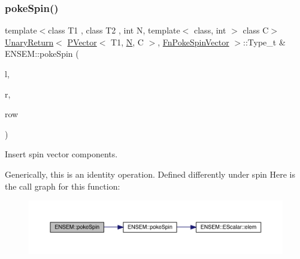 \subsubsection{\texorpdfstring{pokeSpin()}{pokeSpin()}\hspace{0.1cm}{\footnotesize\ttfamily [1/2]}}
{\footnotesize\ttfamily template$<$class T1 , class T2 , int N, template$<$ class, int $>$ class C$>$ \\
\mbox{\hyperlink{structENSEM_1_1UnaryReturn}{Unary\+Return}}$<$ \mbox{\hyperlink{classENSEM_1_1PVector}{P\+Vector}}$<$ T1, \mbox{\hyperlink{operator__name__util_8cc_a7722c8ecbb62d99aee7ce68b1752f337}{N}}, C $>$, \mbox{\hyperlink{structENSEM_1_1FnPokeSpinVector}{Fn\+Poke\+Spin\+Vector}} $>$\+::Type\+\_\+t \& E\+N\+S\+E\+M\+::poke\+Spin (\begin{DoxyParamCaption}\item[{\mbox{\hyperlink{classENSEM_1_1PVector}{P\+Vector}}$<$ T1, \mbox{\hyperlink{operator__name__util_8cc_a7722c8ecbb62d99aee7ce68b1752f337}{N}}, C $>$ \&}]{l,  }\item[{const \mbox{\hyperlink{classENSEM_1_1PVector}{P\+Vector}}$<$ T2, \mbox{\hyperlink{operator__name__util_8cc_a7722c8ecbb62d99aee7ce68b1752f337}{N}}, C $>$ \&}]{r,  }\item[{int}]{row }\end{DoxyParamCaption})\hspace{0.3cm}{\ttfamily [inline]}}



Insert spin vector components. 

Generically, this is an identity operation. Defined differently under spin Here is the call graph for this function\+:\nopagebreak
\begin{figure}[H]
\begin{center}
\leavevmode
\includegraphics[width=350pt]{d3/dc4/group__primvector_ga10934b73afbfb3796cad8a1208d7ab1d_cgraph}
\end{center}
\end{figure}
\mbox{\label{group__primvector_ga89df0ab0f1f2a2f4374c848c2180493f}} 
